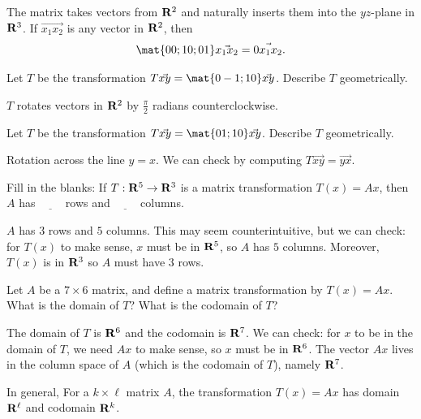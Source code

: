 \begin{problems}
\begin{solution}
The matrix takes vectors from ${\bf R}^2$ and naturally inserts them into the $yz$-plane in ${\bf R}^3$.  If $\vec{x_1 x_2}$ is any vector in ${\bf R}^2$, then
\[\mat{0 0; 1 0; 0 1} \vec{x_1 x_2} = \vec{0 x_1 x_2}.\]
\end{solution}


\problem %
Let $T$ be the transformation $T\vec{x y} = \mat{0 -1; 1 0} \vec{x y}$.
Describe $T$ geometrically.

\begin{solution}
$T$ rotates vectors in ${\bf R}^2$ by $\frac{\pi}{2}$ radians counterclockwise. 
\end{solution}

\problem %
Let $T$ be the transformation $T\vec{x y} = \mat{0 1; 1 0} \vec{x y}$.  Describe
$T$ geometrically.

\begin{solution}
Rotation across the line $y=x$.  We can check by
  computing $T \vec{x y} = \vec{y x}$.
\end{solution}


\problem %
Fill in the blanks: If $T: {\bf R}^{5} \to {\bf R}^3$ is a matrix
transformation $T(x) = Ax$, then $A$ has $\underline{\qquad}$
rows and $\underline{\qquad}$ columns.

\begin{solution}
  $A$ has $3$ rows and $5$ columns.  This may seem counterintuitive,
  but we can check: for $T(x)$ to make sense, $x$ must be in ${\bf R}^5$,
  so $A$ has $5$ columns.  Moreover, $T(x)$ is in ${\bf R}^3$ so $A$
  must have $3$ rows.
\end{solution}


\problem %
Let $A$ be a $7 \times 6$ matrix, and define a matrix transformation
by $T(x) = Ax$.  What is the domain of $T$?  What is the codomain of $T$?

\begin{solution}
  The domain of $T$ is ${\bf R}^6$ and the codomain is ${\bf R}^7$.
  We can check: for $x$ to be in the domain of $T$, we need $Ax$ to
  make sense, so $x$ must be in ${\bf R}^6$.  The vector $Ax$ lives in
  the column space of $A$ (which is the codomain of $T$), namely
  ${\bf R}^7$.

  In general, For a $k \times \ell$ matrix $A$, the transformation
  $T(x) = Ax$ has domain ${\bf R}^{\ell}$ and codomain ${\bf R}^k$.
\end{solution}


\end{problems}
